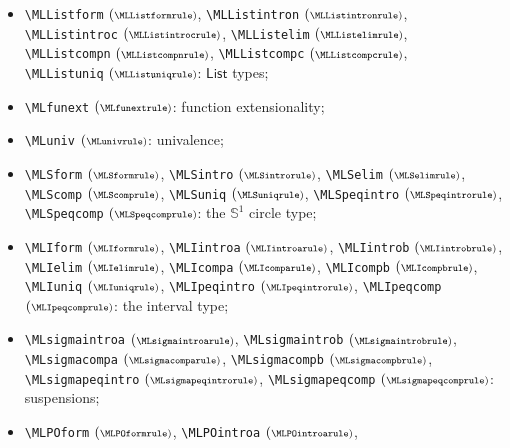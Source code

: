 \documentclass{amsart}
\begin{document}
\begin{itemize}
  \verb|\MLwuniq| $(\scriptstyle\MLwuniqrule)$: $\mathsf{W}$ types;
\item \verb|\MLListform| $(\scriptstyle\MLListformrule)$,
  \verb|\MLListintron| $(\scriptstyle\MLListintronrule)$,\\
  \verb|\MLListintroc| $(\scriptstyle\MLListintrocrule)$,
  \verb|\MLListelim| $(\scriptstyle\MLListelimrule)$,\\
  \verb|\MLListcompn| $(\scriptstyle\MLListcompnrule)$,
  \verb|\MLListcompc| $(\scriptstyle\MLListcompcrule)$,\\
  \verb|\MLListuniq| $(\scriptstyle\MLListuniqrule)$:
  $\mathsf{List}$ types;
\item \verb|\MLfunext| $(\scriptstyle\MLfunextrule)$: function extensionality;
\item \verb|\MLuniv| $(\scriptstyle\MLunivrule)$: univalence;
\item \verb|\MLSform| $(\scriptstyle\MLSformrule)$,
  \verb|\MLSintro| $(\scriptstyle\MLSintrorule)$,
  \verb|\MLSelim| $(\scriptstyle\MLSelimrule)$,\\
  \verb|\MLScomp| $(\scriptstyle\MLScomprule)$,
  \verb|\MLSuniq| $(\scriptstyle\MLSuniqrule)$,
  \verb|\MLSpeqintro| $(\scriptstyle\MLSpeqintrorule)$,\\
  \verb|\MLSpeqcomp| $(\scriptstyle\MLSpeqcomprule)$: the
  $\mathbb{S}^1$ circle type;
\item \verb|\MLIform| $(\scriptstyle\MLIformrule)$,
  \verb|\MLIintroa| $(\scriptstyle\MLIintroarule)$,
  \verb|\MLIintrob| $(\scriptstyle\MLIintrobrule)$, \\
  \verb|\MLIelim| $(\scriptstyle\MLIelimrule)$,
  \verb|\MLIcompa| $(\scriptstyle\MLIcomparule)$,
  \verb|\MLIcompb| $(\scriptstyle\MLIcompbrule)$, \\
  \verb|\MLIuniq| $(\scriptstyle\MLIuniqrule)$,
  \verb|\MLIpeqintro| $(\scriptstyle\MLIpeqintrorule)$,
  \verb|\MLIpeqcomp| $(\scriptstyle\MLIpeqcomprule)$: the interval
  type; 
\item \verb|\MLsigmaintroa| $(\scriptstyle\MLsigmaintroarule)$,
  \verb|\MLsigmaintrob| $(\scriptstyle\MLsigmaintrobrule)$, \\
  \verb|\MLsigmacompa| $(\scriptstyle\MLsigmacomparule)$,
  \verb|\MLsigmacompb| $(\scriptstyle\MLsigmacompbrule)$, \\
  \verb|\MLsigmapeqintro| $(\scriptstyle\MLsigmapeqintrorule)$,
  \verb|\MLsigmapeqcomp| $(\scriptstyle\MLsigmapeqcomprule)$:
  suspensions;
\item \verb|\MLPOform| $(\scriptstyle\MLPOformrule)$,
  \verb|\MLPOintroa| $(\scriptstyle\MLPOintroarule)$,

\end{itemize}
\end{document}
